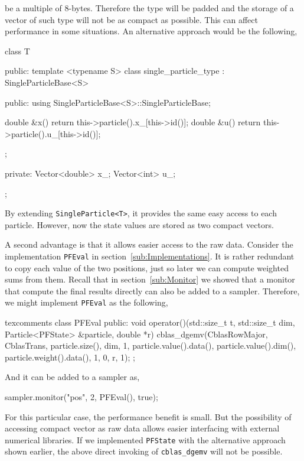 be a multiple of 8-bytes. Therefore the type will be padded and the storage of
a vector of such type will not be as compact as possible. This can affect
performance in some situations. An alternative approach would be the following,
\begin{cppcode}
  class T
  {
      public:
      template <typename S>
      class single_particle_type : SingleParticleBase<S>
      {
          public:
          using SingleParticleBase<S>::SingleParticleBase;

          double &x() { return this->particle().x_[this->id()]; }
          double &u() { return this->particle().u_[this->id()]; }
      };

      private:
      Vector<double> x_;
      Vector<int> u_;
  };
\end{cppcode}
By extending \verb|SingleParticle<T>|, it provides the same easy access to each
particle. However, now the state values are stored as two compact vectors.

A second advantage is that it allows easier access to the raw data. Consider
the implementation \verb|PFEval| in section~\ref{sub:Implementations}. It is
rather redundant to copy each value of the two positions, just so later we can
compute weighted sums from them. Recall that in section~\ref{sub:Monitor} we
showed that a monitor that compute the final results directly can also be added
to a sampler. Therefore, we might implement \verb|PFEval| as the following,
\begin{cppcode*}{texcomments}
  class PFEval
  {
      public:
      void operator()(std::size_t t, std::size_t dim,
          Particle<PFState> &particle, double *r)
      {
          cblas_dgemv(CblasRowMajor, CblasTrans, particle.size(), dim, 1,
              particle.value().data(), particle.value().dim(),
              particle.weight().data(), 1, 0, r, 1);
      }
  };
\end{cppcode*}
And it can be added to a sampler as,
\begin{cppcode}
  sampler.monitor("pos", 2, PFEval(), true);
\end{cppcode}
For this particular case, the performance benefit is small. But the possibility
of accessing compact vector as raw data allows easier interfacing with external
numerical libraries. If we implemented \verb|PFState| with the alternative
approach shown earlier, the above direct invoking of \verb|cblas_dgemv| will
not be possible.
